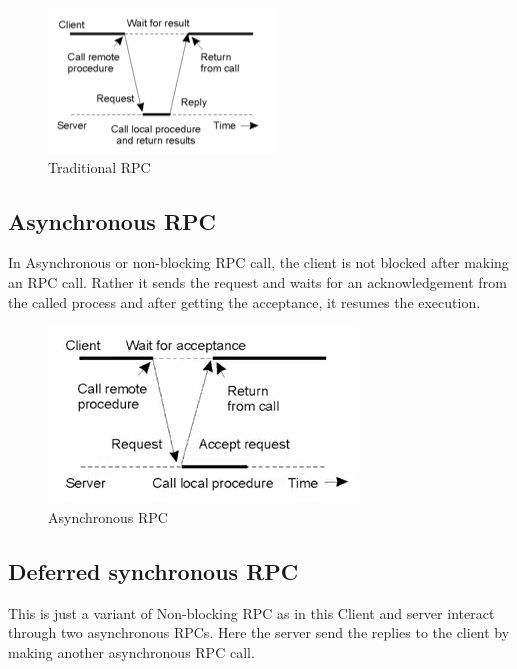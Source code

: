 \documentclass[twoside]{article}
\begin{document}
\begin{figure}[h]
\begin{center}
\includegraphics[scale=0.8]{images/trad_RPC}
\caption{Traditional RPC}
\end{center}
\end{figure}

\subsection{Asynchronous RPC}

In Asynchronous or non-blocking RPC call, the client is not blocked after making an RPC call. Rather it sends the request and waits for an acknowledgement from the called process and after getting the acceptance, it resumes the execution.

\begin{figure}[h]
\begin{center}
\includegraphics[scale=0.8]{images/async_RPC}
\caption{Asynchronous RPC}
\end{center}
\end{figure}

\subsection{Deferred synchronous RPC}

This is just a variant of Non-blocking RPC as in this Client and server interact through two asynchronous RPCs. Here the server send the replies to the client by making another asynchronous RPC call.
\end{document}

